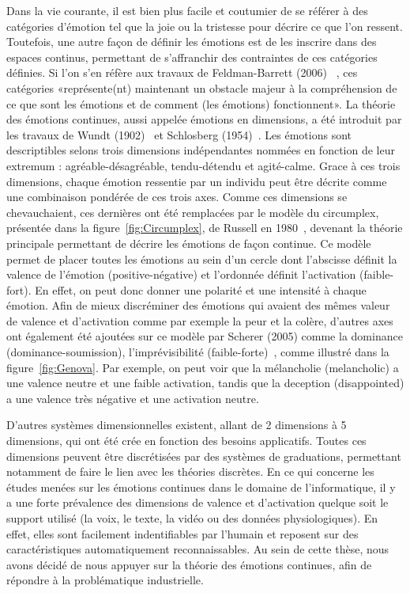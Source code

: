 
Dans la vie courante, il est bien plus facile et coutumier de se référer à des catégories d'émotion tel que la joie ou la tristesse pour décrire ce que l'on ressent. Toutefois, une autre façon de définir les émotions est de les inscrire dans des espaces continus, permettant de s'affranchir des contraintes de ces catégories définies. Si l'on s'en réfère aux travaux de Feldman-Barrett (2006)~\cite{Feldman2006} , ces catégories «représente(nt) maintenant un obstacle majeur à la compréhension de ce que sont les émotions et de comment (les émotions) fonctionnent».
La théorie des émotions continues, aussi appelée émotions en dimensions, a été introduit par les travaux de Wundt (1902)~\cite{Wundt1902} et Schlosberg (1954)~\cite{Schlosberg1954}. Les émotions sont descriptibles selons trois dimensions indépendantes nommées en fonction de leur extremum : agréable-désagréable, tendu-détendu et agité-calme. Grace à ces trois dimensions, chaque émotion ressentie par un individu peut être décrite comme une combinaison pondérée de ces trois axes.  Comme ces dimensions se chevauchaient, ces dernières ont été remplacées par le modèle du circumplex, présentée dans la figure~\ref{fig:Circumplex}, de Russell en 1980~\cite{Russell1980}, devenant la théorie principale permettant de décrire les émotions de façon continue. Ce modèle permet de placer toutes les émotions au sein d'un cercle dont l'abscisse définit la valence de l'émotion (positive-négative) et l'ordonnée définit l'activation (faible-fort). En effet, on peut donc donner une polarité et une intensité à chaque émotion. Afin de mieux discréminer des émotions qui avaient des mêmes valeur de valence et d'activation comme par exemple la peur et la colère, d'autres axes ont également été ajoutées sur ce modèle par Scherer (2005) comme la dominance (dominance-soumission), l'imprévisibilité (faible-forte)~\cite{Scherer2005}, comme illustré dans la figure~\ref{fig:Genova}. Par exemple, on peut voir que la mélancholie (melancholic) a une valence neutre et une faible activation, tandis que la deception (disappointed) a une valence très négative et une activation neutre.

D'autres systèmes dimensionnelles existent, allant de 2 dimensions à 5 dimensions, qui ont été crée en fonction des besoins applicatifs. Toutes ces dimensions peuvent être discrétisées par des systèmes de graduations, permettant notamment de faire le lien avec les théories discrètes.
En ce qui concerne les études menées sur les émotions continues dans le domaine de l'informatique, il y a une forte prévalence des dimensions de valence et d'activation quelque soit le support utilisé (la voix, le texte, la vidéo ou des données physiologiques). En effet, elles sont facilement indentifiables par l'humain et reposent sur des caractéristiques automatiquement reconnaissables. Au sein de cette thèse, nous avons décidé de nous appuyer sur la théorie des émotions continues, afin de répondre à la problématique industrielle.


